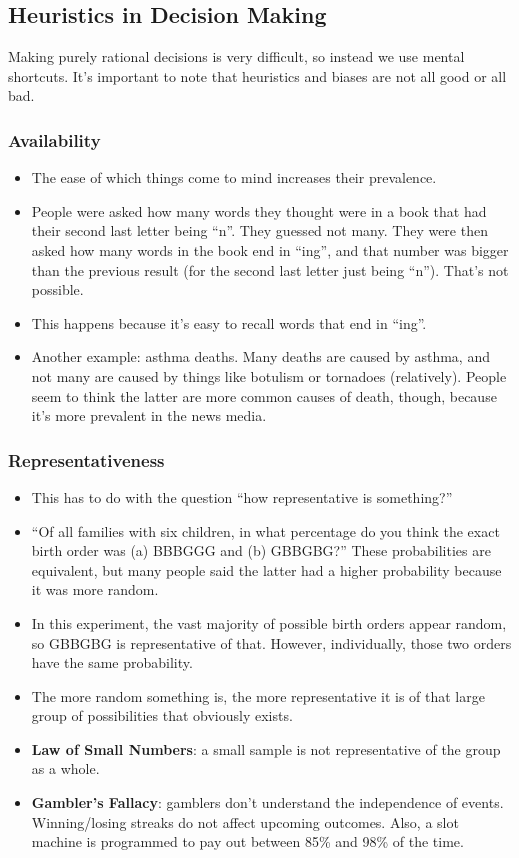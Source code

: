 \documentclass[]{article}
\begin{document}
		\subsection{Heuristics in Decision Making}
			Making purely rational decisions is very difficult, so instead we use mental shortcuts. It's important to note that heuristics and biases are not all good or all bad.
			\subsubsection{Availability}
				\begin{itemize}
					\item The ease of which things come to mind increases their prevalence.
					\item People were asked how many words they thought were in a book that had their second last letter being ``n''. They guessed not many. They were then asked how many words in the book end in ``ing'', and that number was bigger than the previous result (for the second last letter just being ``n''). That's not possible.
					\item This happens because it's easy to recall words that end in ``ing''.
					\item Another example: asthma deaths. Many deaths are caused by asthma, and not many are caused by things like botulism or tornadoes (relatively). People seem to think the latter are more common causes of death, though, because it's more prevalent in the news media.
				\end{itemize}

			\subsubsection{Representativeness}
				\begin{itemize}
					\item This has to do with the question ``how representative is something?''
					\item ``Of all families with six children, in what percentage do you think the exact birth order was (a) BBBGGG and (b) GBBGBG?'' These probabilities are equivalent, but many people said the latter had a higher probability because it was more random.
					\item In this experiment, the vast majority of possible birth orders appear random, so GBBGBG is representative of that. However, individually, those two orders have the same probability.
					\item The more random something is, the more representative it is of that large group of possibilities that obviously exists.
					\item \textbf{Law of Small Numbers}: a small sample is not representative of the group as a whole.
					\item \textbf{Gambler's Fallacy}: gamblers don't understand the independence of events. Winning/losing streaks do not affect upcoming outcomes. Also, a slot machine is programmed to pay out between 85\% and 98\% of the time.
				\end{itemize}
\end{document}
